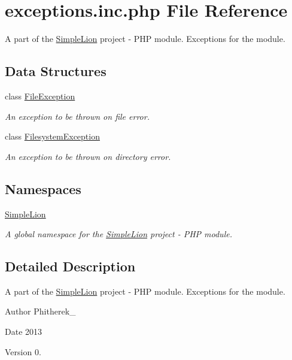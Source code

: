 \hypertarget{exceptions_8inc_8php}{\section{exceptions.\-inc.\-php File Reference}
\label{exceptions_8inc_8php}
}


A part of the \hyperlink{namespace_simple_lion}{Simple\-Lion} project -\/ P\-H\-P module. Exceptions for the module.  


\subsection*{Data Structures}
\begin{DoxyCompactItemize}
\item 
class \hyperlink{class_simple_lion_1_1_file_exception}{File\-Exception}
\begin{DoxyCompactList}\small\item\em An exception to be thrown on file error. \end{DoxyCompactList}\item 
class \hyperlink{class_simple_lion_1_1_filesystem_exception}{Filesystem\-Exception}
\begin{DoxyCompactList}\small\item\em An exception to be thrown on directory error. \end{DoxyCompactList}\end{DoxyCompactItemize}
\subsection*{Namespaces}
\begin{DoxyCompactItemize}
\item 
\hyperlink{namespace_simple_lion}{Simple\-Lion}
\begin{DoxyCompactList}\small\item\em A global namespace for the \hyperlink{namespace_simple_lion}{Simple\-Lion} project -\/ P\-H\-P module. \end{DoxyCompactList}\end{DoxyCompactItemize}


\subsection{Detailed Description}
A part of the \hyperlink{namespace_simple_lion}{Simple\-Lion} project -\/ P\-H\-P module. Exceptions for the module. \begin{DoxyAuthor}{Author}
Phitherek\-\_\- 
\end{DoxyAuthor}
\begin{DoxyDate}{Date}
2013 
\end{DoxyDate}
\begin{DoxyVersion}{Version}
0. 
\end{DoxyVersion}
